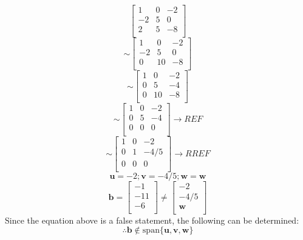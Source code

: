 \documentclass{report}
\begin{document}
\begin{equation}
\begin{bmatrix}
1 & 0 & -2 \\ 
-2 & 5 & 0 \\ 
2 & 5 & -8 \\ 
\end{bmatrix}
\end{equation}
\begin{equation}
\sim
\begin{bmatrix}
1 & 0 & -2 \\ 
-2 & 5 & 0 \\ 
0 & 10 & -8 \\ 
\end{bmatrix}
\end{equation}
\begin{equation}
\sim
\begin{bmatrix}
1 & 0 & -2 \\ 
0 & 5 & -4 \\ 
0 & 10 & -8 \\ 
\end{bmatrix}
\end{equation}
\begin{equation}
\sim
\begin{bmatrix}
1 & 0 & -2 \\ 
0 & 5 & -4 \\ 
0 & 0 & 0 \\ 
\end{bmatrix}
\rightarrow
REF
\end{equation}
\begin{equation}
\sim
\begin{bmatrix}
1 & 0 & -2 \\ 
0 & 1 & -4/5 \\ 
0 & 0 & 0 \\ 
\end{bmatrix}
\rightarrow
RREF
\end{equation}
\begin{equation*}
\mathbf{u}
=-2;
\mathbf{v}
=-4/5;
\mathbf{w}
=
\mathbf{w}
\end{equation*}
\begin{equation}
\textbf{b}
=
\begin{bmatrix}
-1 \\ 
-11 \\ 
-6 \\ 
\end{bmatrix}
\neq
\begin{bmatrix}
-2 \\ 
-4/5 \\ 
\mathbf{w} \\ 
\end{bmatrix}
\end{equation}
Since the equation above is a false statement, the following can be determined:
\begin{equation}
\therefore
\textbf{b}
\notin
\mathrm{span}\{\mathbf{u}, \mathbf{v}, \mathbf{w}\}
\end{equation}
\end{document}
